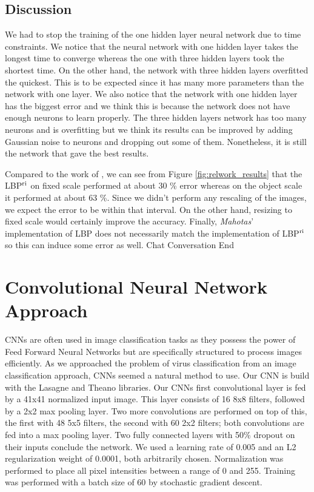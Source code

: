 \begin{multicols}{2}
\subsection{Discussion}
We had to stop the training of the one hidden layer neural network due to time constraints. We notice that the neural network with one hidden layer takes the longest time to converge whereas the one with three hidden layers took the shortest time. On the other hand, the network with three hidden layers overfitted the quickest. This is to be expected since it has many more parameters than the network with one layer. We also notice that the network with one hidden layer has the biggest error and we think this is because the network does not have enough neurons to learn properly. The three hidden layers network has too many neurons and is overfitting but we think its results can be improved by adding Gaussian noise to neurons and dropping out some of them. Nonetheless, it is still the network that gave the best results. 
\par Compared to the work of \citet{kylberg2011virus}, we can see from Figure \ref{fig:relwork_results} that the LBP$^{\textnormal{ri}}$ on fixed scale performed at about 30 \% error whereas on the object scale it performed at about 63 \%. Since we didn't perform any rescaling of the images, we expect the error to be within that interval. On the other hand, resizing to fixed scale would certainly improve the accuracy. Finally, \emph{Mahotas}' implementation of LBP does not necessarily match the implementation of LBP$^{\textnormal{ri}}$ so this can induce some error as well.
Chat Conversation End



\section{Convolutional Neural Network Approach}
CNNs are often used in image classification tasks as they possess the power of Feed Forward Neural Networks but are specifically structured to process images efficiently. As we approached the problem of virus classification from an image classification approach, CNNs seemed a natural method to use.
Our CNN is build with the Lasagne and Theano \cite{Bastien-Theano-2012, bergstra+al:2010-scipy} libraries. Our CNNs first convolutional layer is fed by a 41x41 normalized input image. This layer consists of 16 8x8 filters, followed by a 2x2 max pooling layer. Two more convolutions are performed on top of this, the first with 48 5x5 filters, the second with 60 2x2 filters; both convolutions are fed into a max pooling layer. Two fully connected layers with 50\% dropout on their inputs conclude the network. We used a learning rate of 0.005 and an L2 regularization weight of 0.0001, both arbitrarily chosen. Normalization was performed to place all pixel intensities between a range of 0 and 255. Training was performed with a batch size of 60 by stochastic gradient descent.


\end{multicols}

